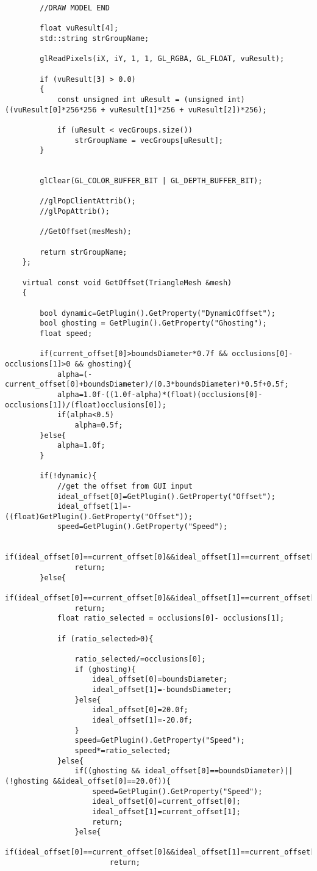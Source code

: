 \begin{verbatim}
		//DRAW MODEL END

		float vuResult[4];
		std::string strGroupName;

		glReadPixels(iX, iY, 1, 1, GL_RGBA, GL_FLOAT, vuResult);

		if (vuResult[3] > 0.0)
		{
			const unsigned int uResult = (unsigned int)((vuResult[0]*256*256 + vuResult[1]*256 + vuResult[2])*256);

			if (uResult < vecGroups.size())
				strGroupName = vecGroups[uResult];
		}


		glClear(GL_COLOR_BUFFER_BIT | GL_DEPTH_BUFFER_BIT);

		//glPopClientAttrib();
		//glPopAttrib();

		//GetOffset(mesMesh);

		return strGroupName;
	};

	virtual const void GetOffset(TriangleMesh &mesh)
	{

		bool dynamic=GetPlugin().GetProperty("DynamicOffset");
		bool ghosting = GetPlugin().GetProperty("Ghosting");
		float speed;

		if(current_offset[0]>boundsDiameter*0.7f && occlusions[0]- occlusions[1]>0 && ghosting){
			alpha=(-current_offset[0]+boundsDiameter)/(0.3*boundsDiameter)*0.5f+0.5f;
			alpha=1.0f-((1.0f-alpha)*(float)(occlusions[0]- occlusions[1])/(float)occlusions[0]);
			if(alpha<0.5)
				alpha=0.5f;
		}else{
			alpha=1.0f;
		}

		if(!dynamic){
			//get the offset from GUI input
			ideal_offset[0]=GetPlugin().GetProperty("Offset");
			ideal_offset[1]=-((float)GetPlugin().GetProperty("Offset"));
			speed=GetPlugin().GetProperty("Speed");

			if(ideal_offset[0]==current_offset[0]&&ideal_offset[1]==current_offset[1])
				return;
		}else{
			if(ideal_offset[0]==current_offset[0]&&ideal_offset[1]==current_offset[1])
				return;
			float ratio_selected = occlusions[0]- occlusions[1];

			if (ratio_selected>0){
				
				ratio_selected/=occlusions[0];
				if (ghosting){
					ideal_offset[0]=boundsDiameter;
					ideal_offset[1]=-boundsDiameter;
				}else{
					ideal_offset[0]=20.0f;
					ideal_offset[1]=-20.0f;
				}
				speed=GetPlugin().GetProperty("Speed");
				speed*=ratio_selected;
			}else{
				if((ghosting && ideal_offset[0]==boundsDiameter)||(!ghosting &&ideal_offset[0]==20.0f)){
					speed=GetPlugin().GetProperty("Speed");
					ideal_offset[0]=current_offset[0];
					ideal_offset[1]=current_offset[1];
					return;
				}else{
					if(ideal_offset[0]==current_offset[0]&&ideal_offset[1]==current_offset[1])
						return;


\end{verbatim}
